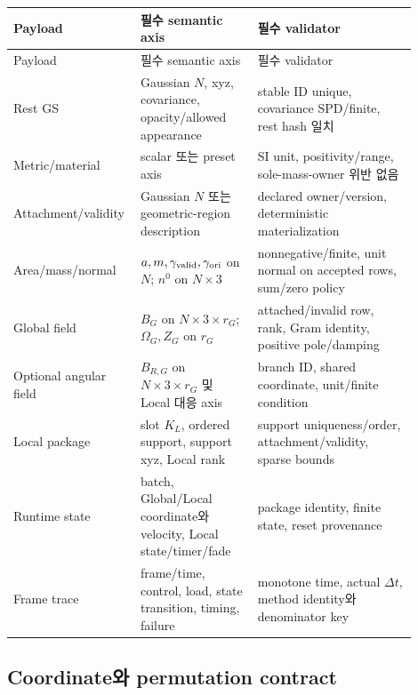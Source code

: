 \documentclass[10pt]{article}
\begin{document}
\begin{longtable}{L{0.24\linewidth}L{0.28\linewidth}L{0.38\linewidth}}
\toprule
Payload & 필수 semantic axis & 필수 validator\\
\midrule
\endfirsthead
\toprule
Payload & 필수 semantic axis & 필수 validator\\
\midrule
\endhead
Rest GS & Gaussian \(N\), xyz, covariance, opacity/allowed appearance & stable ID unique, covariance SPD/finite, rest hash 일치\\
Metric/material & scalar 또는 preset axis & SI unit, positivity/range, sole-mass-owner 위반 없음\\
Attachment/validity & Gaussian \(N\) 또는 geometric-region description & declared owner/version, deterministic materialization\\
Area/mass/normal & \(a,m,\gamma_{\rm valid},\gamma_{\rm ori}\) on \(N\); \(n^0\) on \(N\times3\) & nonnegative/finite, unit normal on accepted rows, sum/zero policy\\
Global field & \(B_G\) on \(N\times3\times r_G\); \(\Omega_G,Z_G\) on \(r_G\) & attached/invalid row, rank, Gram identity, positive pole/damping\\
Optional angular field & \(B_{R,G}\) on \(N\times3\times r_G\) 및 Local 대응 axis & branch ID, shared coordinate, unit/finite condition\\
Local package & slot \(K_L\), ordered support, support xyz, Local rank & support uniqueness/order, attachment/validity, sparse bounds\\
Runtime state & batch, Global/Local coordinate와 velocity, Local state/timer/fade & package identity, finite state, reset provenance\\
Frame trace & frame/time, control, load, state transition, timing, failure & monotone time, actual \(\Delta t\), method identity와 denominator key\\
\bottomrule
\end{longtable}

\subsection{Coordinate와 permutation contract}
\end{document}
